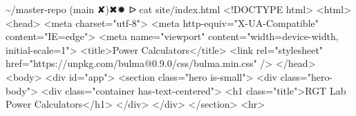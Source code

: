 \documentclass[
  letterpaper,
  DIV=11,
  numbers=noendperiod,
  oneside]{scrartcl}
\newenvironment{Shaded}{\begin{snugshade}}{\end{snugshade}}
\newcommand{\ErrorTok}[1]{\textcolor[rgb]{0.68,0.00,0.00}{#1}}
\newcommand{\ExtensionTok}[1]{\textcolor[rgb]{0.00,0.23,0.31}{#1}}
\newcommand{\KeywordTok}[1]{\textcolor[rgb]{0.00,0.23,0.31}{#1}}
\newcommand{\NormalTok}[1]{\textcolor[rgb]{0.00,0.23,0.31}{#1}}
\newcommand{\OperatorTok}[1]{\textcolor[rgb]{0.37,0.37,0.37}{#1}}
\newcommand{\StringTok}[1]{\textcolor[rgb]{0.13,0.47,0.30}{#1}}
\newcommand{\VariableTok}[1]{\textcolor[rgb]{0.07,0.07,0.07}{#1}}
\begin{document}
\begin{Shaded}
\begin{Highlighting}[]
\ExtensionTok{\textasciitilde{}/master{-}repo} \ErrorTok{(}\ExtensionTok{main}\NormalTok{ ✘}\KeywordTok{)}\ExtensionTok{✖✹}\NormalTok{ ᐅ cat site/index.html}
\OperatorTok{\textless{}}\NormalTok{!DOCTYPE }\ExtensionTok{html}\OperatorTok{\textgreater{}}
\OperatorTok{\textless{}}\NormalTok{html}\OperatorTok{\textgreater{}}
  \OperatorTok{\textless{}}\NormalTok{head}\OperatorTok{\textgreater{}}
    \OperatorTok{\textless{}}\NormalTok{meta }\VariableTok{charset}\OperatorTok{=}\StringTok{"utf{-}8"}\OperatorTok{\textgreater{}}
    \OperatorTok{\textless{}}\NormalTok{meta }\ExtensionTok{http{-}equiv=}\StringTok{"X{-}UA{-}Compatible"}\NormalTok{ content=}\StringTok{"IE=edge"}\OperatorTok{\textgreater{}}
    \OperatorTok{\textless{}}\NormalTok{meta }\VariableTok{name}\OperatorTok{=}\StringTok{"viewport"} \VariableTok{content}\OperatorTok{=}\StringTok{"width=device{-}width, initial{-}scale=1"}\OperatorTok{\textgreater{}}
    \OperatorTok{\textless{}}\NormalTok{title}\OperatorTok{\textgreater{}}\NormalTok{Power }\ExtensionTok{Calculators}\OperatorTok{\textless{}}\NormalTok{/title}\OperatorTok{\textgreater{}}
    \OperatorTok{\textless{}}\NormalTok{link }\VariableTok{rel}\OperatorTok{=}\StringTok{"stylesheet"} \VariableTok{href}\OperatorTok{=}\StringTok{"https://unpkg.com/bulma@0.9.0/css/bulma.min.css"} \ExtensionTok{/}\OperatorTok{\textgreater{}}
  \OperatorTok{\textless{}}\NormalTok{/head}\OperatorTok{\textgreater{}}
  \OperatorTok{\textless{}}\NormalTok{body}\OperatorTok{\textgreater{}}
    \OperatorTok{\textless{}}\NormalTok{div }\VariableTok{id}\OperatorTok{=}\StringTok{"app"}\OperatorTok{\textgreater{}}
      \OperatorTok{\textless{}}\NormalTok{section }\VariableTok{class}\OperatorTok{=}\StringTok{"hero is{-}small"}\OperatorTok{\textgreater{}}
        \OperatorTok{\textless{}}\NormalTok{div }\VariableTok{class}\OperatorTok{=}\StringTok{"hero{-}body"}\OperatorTok{\textgreater{}}
          \OperatorTok{\textless{}}\NormalTok{div }\VariableTok{class}\OperatorTok{=}\StringTok{"container has{-}text{-}centered"}\OperatorTok{\textgreater{}}
            \OperatorTok{\textless{}}\NormalTok{h1 }\VariableTok{class}\OperatorTok{=}\StringTok{"title"}\OperatorTok{\textgreater{}}\NormalTok{RGT }\ExtensionTok{Lab}\NormalTok{ Power Calculators}\OperatorTok{\textless{}}\NormalTok{/h1}\OperatorTok{\textgreater{}}
          \OperatorTok{\textless{}}\NormalTok{/div}\OperatorTok{\textgreater{}}
        \OperatorTok{\textless{}}\NormalTok{/div}\OperatorTok{\textgreater{}}
      \OperatorTok{\textless{}}\NormalTok{/section}\OperatorTok{\textgreater{}}
            \OperatorTok{\textless{}}\NormalTok{hr}\OperatorTok{\textgreater{}}


\end{Highlighting}
\end{Shaded}
\end{document}
